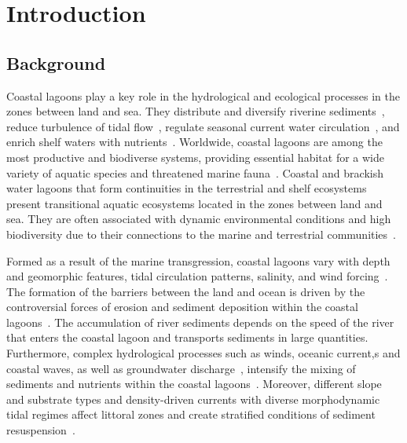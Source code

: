 \documentclass[jmse,article,accept,pdftex,oneauthor]{Definitions/mdpi}
\begin{document}
\section{Introduction}

\subsection{Background}

Coastal lagoons play a key role in the hydrological and ecological processes in the zones between land and sea. They distribute and diversify riverine sediments~\cite{AMARAL2023165264}, reduce turbulence of tidal flow~\cite{XUE2023103048}, regulate seasonal current water circulation~\cite{MAO2023102276}, and enrich shelf waters with nutrients~\cite{CEBRIAN20099}. Worldwide, coastal lagoons are among the most productive and biodiverse systems, providing essential habitat for a wide variety of aquatic species and threatened marine fauna~\cite{MATEOSMOLINA2024116117,ZAMORALOPEZ2023108447,MIGNUCCI2023108450}. Coastal and brackish water lagoons that form continuities in the terrestrial and shelf ecosystems present transitional aquatic ecosystems located in the zones between land and sea. They are often associated with dynamic environmental conditions and high biodiversity due to their connections to the marine and terrestrial communities~\cite{PEREZRUZAFA2019253}. 

Formed as a result of the marine transgression, coastal lagoons vary with depth and geomorphic features, tidal circulation patterns, salinity, and wind forcing~\cite{KJERFVE198663}. The formation of the barriers between the land and ocean is driven by the controversial forces of erosion and sediment deposition within the coastal lagoons~\cite{BOYD1992139}. The accumulation of river sediments depends on the speed of the river that enters the coastal lagoon and transports sediments in large quantities. Furthermore, complex hydrological processes such as winds, oceanic current,s and coastal waves, as well as groundwater discharge~\cite{DANISH2020103816}, intensify the mixing of sediments and nutrients within the coastal lagoons~\cite{KUMAR2016155}. Moreover, different slope and substrate types and density-driven currents with diverse morphodynamic tidal regimes affect littoral zones and create stratified conditions of sediment resuspension~\cite{BORTOLIN2020105782,Larson2012}. 
\end{document}

